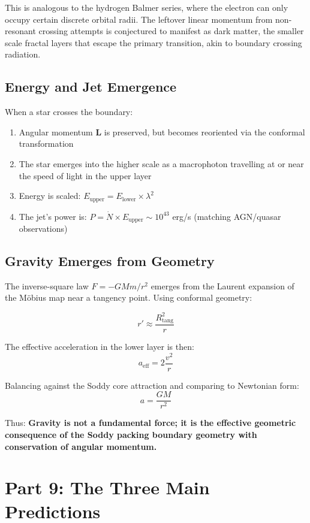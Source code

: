 \documentclass[11pt,a4paper]{article}
\begin{document}
This is analogous to the hydrogen Balmer series, where the electron can only occupy certain discrete orbital radii. The leftover linear momentum from non-resonant crossing attempts is conjectured to manifest as dark matter, the smaller scale fractal layers that escape the primary transition, akin to boundary crossing radiation.

\subsection{Energy and Jet Emergence}

When a star crosses the boundary:
\begin{enumerate}
\item Angular momentum $\mathbf{L}$ is preserved, but becomes reoriented via the conformal transformation
\item The star emerges into the higher scale as a macrophoton travelling at or near the speed of light in the upper layer
\item Energy is scaled: $E_{\text{upper}} = E_{\text{lower}} \times \lambda^2$
\item The jet's power is: $P = \dot{N} \times E_{\text{upper}} \sim 10^{43}$ erg/s (matching AGN/quasar observations)
\end{enumerate}

\subsection{Gravity Emerges from Geometry}

The inverse-square law $F = -GMm/r^2$ emerges from the Laurent expansion of the Möbius map near a tangency point. Using conformal geometry:

\[
r' \approx \frac{R_{\text{tang}}^2}{r}
\]

The effective acceleration in the lower layer is then:
\[
a_{\text{eff}} = 2\frac{v^2}{r}
\]

Balancing against the Soddy core attraction and comparing to Newtonian form:
\[
a = \frac{GM}{r^2}
\]

Thus: \textbf{Gravity is not a fundamental force; it is the effective geometric consequence of the Soddy packing boundary geometry with conservation of angular momentum.}

\section{Part 9: The Three Main Predictions}
\end{document}
